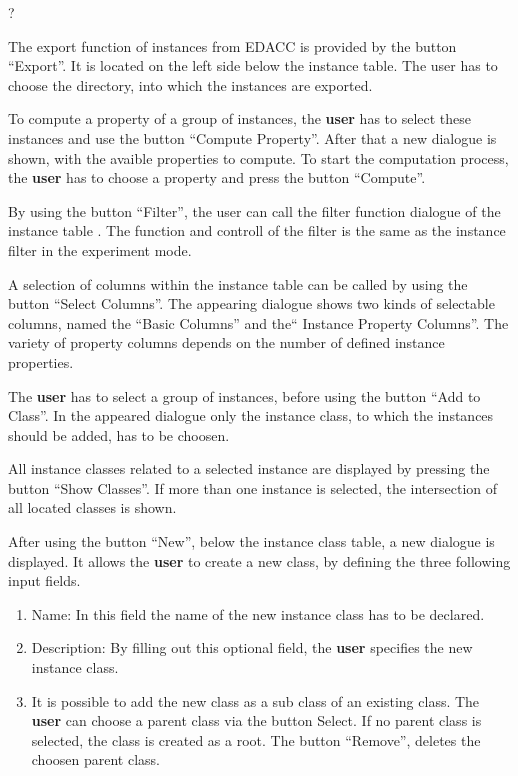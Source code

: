  ?

 The export function of instances from EDACC is provided by the button ``Export''. It is located on the left side below the instance table. The user has to choose the directory, into which the instances are exported.

 To compute a property of a group of instances, the \textbf{user} has to select these instances and use the button ``Compute Property''. After that a new dialogue is shown, with the avaible properties to compute. To start the computation process,  the \textbf{user} has to choose a property and press the button ``Compute''.

 By using the button ``Filter'', the user can call the filter function dialogue of the instance table . The function and controll of the filter is the same as the instance filter in the experiment mode.

 A selection of columns within the instance table can be called by using the button ``Select Columns''. The appearing dialogue shows two kinds of selectable columns, named the ``Basic Columns'' and the`` Instance Property Columns''. The variety of property columns depends on the number of defined instance properties.  

 The \textbf{user} has to select a group of instances, before using the button ``Add to Class''. In the appeared dialogue only the instance class, to which the instances should be added, has to be choosen.

 All instance classes related to a selected instance are displayed by pressing the button ``Show Classes''. If more than one instance is selected, the intersection of all located classes is shown.

\label{createInstanceClass} After using the button ``New'', below the instance class table, a new dialogue is displayed. It allows the \textbf{user} to create a new class, by defining the three following input fields.
\begin{enumerate}
	\item Name: In this field the name of the new instance class has to be declared.
	\item Description: By filling out this optional field, the \textbf{user} specifies the new instance class.
	\item It is possible to  add the new class as a sub class of an existing class. The \textbf{user} can choose a parent class via the button Select. If no parent class is selected, the class is created as a root. The button ``Remove'', deletes the choosen parent class.
\end{enumerate}

